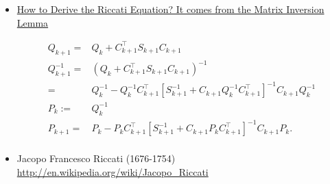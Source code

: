 \documentclass[letterpaper]{article}
\begin{document}
\begin{enumerate}
\begin{itemize}
        \item \underline{How to Derive the Riccati Equation? It comes from the Matrix Inversion Lemma}

\begin{align*}
Q_{k+1}  = & Q_k + C_{k+1}^\top S_{k+1} C_{k+1} \\
  Q_{k+1}^{-1} = & \left( Q_{k} + C_{k+1}^\top S_{k+1} C_{k+1}\right)^{-1} \\
   =& Q_k^{-1} -  Q_k^{-1}C_{k+1}^\top \left[ S_{k+1}^{-1}  + C_{k+1}  Q_k^{-1}  C_{k+1}^\top \right]^{-1} C_{k+1} Q_k^{-1}\\
   P_k:=  &Q_k^{-1}\\
   P_{k+1}  =&  P_k -  P_k C_{k+1}^\top \left[ S_{k+1}^{-1} +  C_{k+1}  P_k  C_{k+1}^\top \right]^{-1}C_{k+1} P_k.\\
    \end{align*}

    \item Jacopo Francesco Riccati (1676-1754) \url{http://en.wikipedia.org/wiki/Jacopo_Riccati}

           \end{itemize}

         \end{enumerate}
\vspace{1cm}
\end{document}

